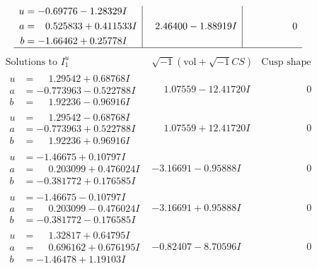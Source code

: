 \documentclass[1p]{elsarticle_modified}
\theoremstyle{definition}
\newcommand{\I}{\sqrt{-1}}
\begin{document}
$$\begin{array}{c|c|c}
\begin{aligned}
u &= -0.69776 - 1.28329 I \\
a &= \phantom{-}0.525833 + 0.411533 I \\
b &= -1.66462 + 0.25778 I\end{aligned}
 & \phantom{-}2.46400 - 1.88919 I & \phantom{-0.000000 } 0\\
 \hline 
 \end{array}$$\newpage$$\begin{array}{c|c|c}  
\text{Solutions to }I^u_{1}& \I (\text{vol} + \sqrt{-1}CS) & \text{Cusp shape}\\
 \hline 
\begin{aligned}
u &= \phantom{-}1.29542 + 0.68768 I \\
a &= -0.773963 - 0.522788 I \\
b &= \phantom{-}1.92236 - 0.96916 I\end{aligned}
 & \phantom{-}1.07559 - 12.41720 I & \phantom{-0.000000 } 0 \\ \hline\begin{aligned}
u &= \phantom{-}1.29542 - 0.68768 I \\
a &= -0.773963 + 0.522788 I \\
b &= \phantom{-}1.92236 + 0.96916 I\end{aligned}
 & \phantom{-}1.07559 + 12.41720 I & \phantom{-0.000000 } 0 \\ \hline\begin{aligned}
u &= -1.46675 + 0.10797 I \\
a &= \phantom{-}0.203099 + 0.476024 I \\
b &= -0.381772 + 0.176585 I\end{aligned}
 & -3.16691 - 0.95888 I & \phantom{-0.000000 } 0 \\ \hline\begin{aligned}
u &= -1.46675 - 0.10797 I \\
a &= \phantom{-}0.203099 - 0.476024 I \\
b &= -0.381772 - 0.176585 I\end{aligned}
 & -3.16691 + 0.95888 I & \phantom{-0.000000 } 0 \\ \hline\begin{aligned}
u &= \phantom{-}1.32817 + 0.64795 I \\
a &= \phantom{-}0.696162 + 0.676195 I \\
b &= -1.46478 + 1.19103 I\end{aligned}
 & -0.82407 - 8.70596 I & \phantom{-0.000000 } 0 \\ \hline\begin{aligned}

\end{aligned}
\end{array}$$
\end{document}
